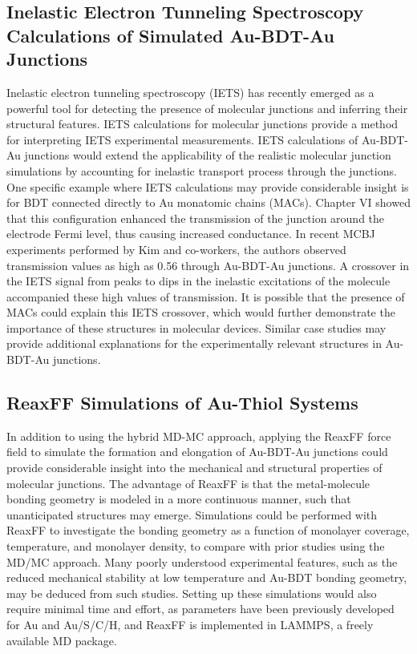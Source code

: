 \documentclass[10pt]{report}  %
\newcommand\findent{\hspace*{\parindent}}
\begin{document}
\subsection{Inelastic Electron Tunneling Spectroscopy Calculations of Simulated Au-BDT-Au Junctions}

\findent Inelastic electron tunneling spectroscopy (IETS) has recently emerged as a powerful tool for detecting the presence of molecular junctions and inferring their structural features. \cite{Song:2009,Tsutsui:2009-nanoscale,Kim:2011,Bruot:2012} IETS calculations \cite{Paulsson:2009,Lin:2011,Demir:2012} for molecular junctions provide a method for interpreting IETS experimental measurements. IETS calculations of Au-BDT-Au junctions would extend the applicability of the realistic molecular junction simulations by accounting for inelastic transport process through the junctions. One specific example where IETS calculations may provide considerable insight is for BDT connected directly to Au monatomic chains (MACs). Chapter VI showed that this configuration enhanced the transmission of the junction around the electrode Fermi level, thus causing increased conductance. In recent MCBJ experiments performed by Kim and co-workers, \cite{Kim:2011} the authors observed transmission values as high as 0.56 through Au-BDT-Au junctions. A crossover in the IETS signal from peaks to dips in the inelastic excitations of the molecule accompanied these high values of transmission. It is possible that the presence of MACs could explain this IETS crossover, which would further demonstrate the importance of these structures in molecular devices. Similar case studies may provide additional explanations for the experimentally relevant structures in Au-BDT-Au junctions.

\subsection{ReaxFF Simulations of Au-Thiol Systems}

\findent In addition to using the hybrid MD-MC approach, applying the ReaxFF force field to simulate the formation and elongation of Au-BDT-Au junctions could provide considerable insight into the mechanical and structural properties of molecular junctions. The advantage of ReaxFF is that the metal-molecule bonding geometry is modeled in a more continuous manner, such that unanticipated structures may emerge. Simulations could be performed with ReaxFF to investigate the bonding geometry as a function of monolayer coverage, temperature, and monolayer density, to compare with prior studies using the MD/MC approach. Many poorly understood experimental features, such as the reduced mechanical stability at low temperature \cite{Tsutsui:2009} and Au-BDT bonding geometry, \cite{Strange:2011} may be deduced from such studies. Setting up these simulations would also require minimal time and effort, as parameters have been previously developed for Au\cite{Keith:2010,Jarvi:2008} and Au/S/C/H,\cite{Jarvi:2011} and ReaxFF is implemented in LAMMPS,\cite{Plimpton:1995} a freely available MD package.

\singlespacing


\end{document}
